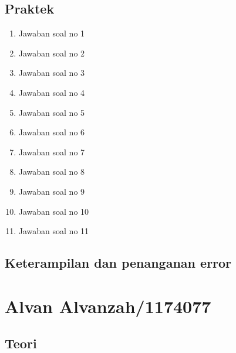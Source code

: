 \subsection{Praktek}
\begin{enumerate}
    \item Jawaban soal no 1
    
    \item Jawaban soal no 2
    
    \item Jawaban soal no 3
    
    \item Jawaban soal no 4
    
    \item Jawaban soal no 5
    
    \item Jawaban soal no 6
    
    \item Jawaban soal no 7
    
    \item Jawaban soal no 8
    
    \item Jawaban soal no 9
    
    \item Jawaban soal no 10
    
    \item Jawaban soal no 11
    
\end{enumerate}

\subsection{Keterampilan dan penanganan error}



\section{Alvan Alvanzah/1174077}

\subsection{Teori}

